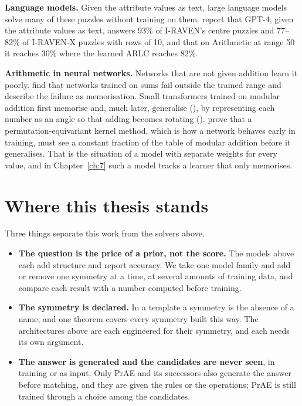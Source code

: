 \textbf{Language models.} Given the attribute values as text, large language models solve many of these puzzles without training on them. \citet{hersche2024towards} report that GPT-4, given the attribute values as text, answers 93\% of I-RAVEN's centre puzzles and 77–82\% of I-RAVEN-X puzzles with rows of 10, and that on Arithmetic at range 50 it reaches 30\% where the learned ARLC reaches 82\%.

\textbf{Arithmetic in neural networks.} Networks that are not given addition learn it poorly. \citet{trask2018neural} find that networks trained on sums fail outside the trained range and describe the failure as memorisation. Small transformers trained on modular addition first memorise and, much later, generalise (\citealp{power2022grokking}), by representing each number as an angle so that adding becomes rotating (\citealp{nanda2023progress}). \citet{mohamadi2024why} prove that a permutation-equivariant kernel method, which is how a network behaves early in training, must see a constant fraction of the table of modular addition before it generalises. That is the situation of a model with separate weights for every value, and in Chapter~\ref{ch:7} such a model tracks a learner that only memorises.

\section{Where this thesis stands}\label{sec:2.6}

Three things separate this work from the solvers above.

\begin{itemize}
\item \textbf{The question is the price of a prior, not the score.} The models above each add structure and report accuracy. We take one model family and add or remove one symmetry at a time, at several amounts of training data, and compare each result with a number computed before training.
\item \textbf{The symmetry is declared.} In a template a symmetry is the absence of a name, and one theorem covers every symmetry built this way. The architectures above are each engineered for their symmetry, and each needs its own argument.
\item \textbf{The answer is generated and the candidates are never seen}, in training or as input. Only PrAE and its successors also generate the answer before matching, and they are given the rules or the operations; PrAE is still trained through a choice among the candidates.
\end{itemize}
